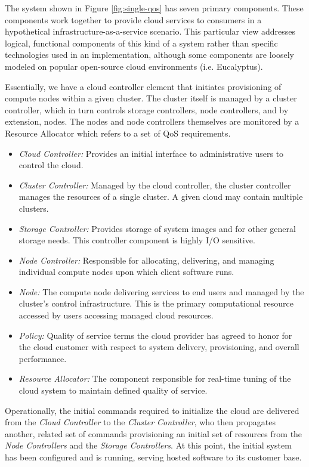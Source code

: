 \documentclass[times, 10pt,twocolumn]{article}
\begin{document}
The system shown in Figure \ref{fig:single-qos} has seven primary components.  These components work together to provide cloud services to consumers in a hypothetical infrastructure-as-a-service scenario.  This particular view addresses logical, functional components of this kind of a system rather than specific technologies used in an implementation, although some components are loosely modeled on popular open-source cloud environments (i.e. Eucalyptus).

Essentially, we have a cloud controller element that initiates provisioning of compute nodes within a given cluster. The cluster itself is managed by a cluster controller, which in turn controls storage controllers, node controllers, and by extension, nodes.  The nodes and node controllers themselves are monitored by a Resource Allocator which refers to a set of QoS requirements.

\begin{itemize}
\item \textit{Cloud Controller:} Provides an initial interface to administrative users to control the cloud.
\item \textit{Cluster Controller:} Managed by the cloud controller, the cluster controller manages the resources of a single cluster. A given cloud may contain multiple clusters.
\item \textit{Storage Controller:} Provides storage of system images and for other general storage needs.  This controller component is highly I/O sensitive.
\item \textit{Node Controller:} Responsible for allocating, delivering, and managing individual compute nodes upon which client software runs.
\item \textit{Node:} The compute node delivering services to end users and managed by the cluster's control infrastructure.  This is the primary computational resource accessed by users accessing managed cloud resources.
\item \textit{Policy:} Quality of service terms the cloud provider has agreed to honor for the cloud customer with respect to system delivery, provisioning, and overall performance.
\item \textit{Resource Allocator:} The component responsible for real-time tuning of the cloud system to maintain defined quality of service.
\end{itemize}

Operationally, the initial commands required to initialize the cloud are delivered from the \textit{Cloud Controller} to the \textit{Cluster Controller}, who then propagates another, related set of commands provisioning an initial set of resources from the \textit{Node Controllers} and the \textit{Storage Controllers}.  At this point, the initial system has been configured and is running, serving hosted software to its customer base.
\end{document}
